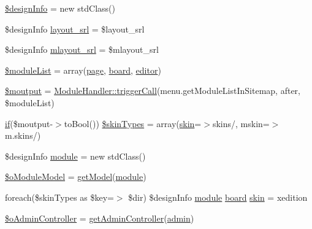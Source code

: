 \begin{DoxyCompactItemize}
\item 
\hyperlink{ko_8install_8php_a99e144f7d563ceb76b003d54739b3b0c}{\$design\+Info} = new std\+Class()
\item 
\$design\+Info \hyperlink{ko_8install_8php_a70054876db09b2519a1726663c8dd9e7}{layout\+\_\+srl} = \$layout\+\_\+srl
\item 
\$design\+Info \hyperlink{ko_8install_8php_a9cf497537007b08c645bed35f564be54}{mlayout\+\_\+srl} = \$mlayout\+\_\+srl
\item 
\hyperlink{ko_8install_8php_aaa80946d50e2d3677fbbc6d6c8a643c3}{\$module\+List} = array(\textquotesingle{}\hyperlink{classpage}{page}\textquotesingle{}, \textquotesingle{}\hyperlink{classboard}{board}\textquotesingle{}, \textquotesingle{}\hyperlink{classeditor}{editor}\textquotesingle{})
\item 
\hyperlink{ko_8install_8php_a2598d068355cca17645bc6bd70cc3a8c}{\$moutput} = \hyperlink{classModuleHandler_aa1b1f9eae91ccd76e6a81c9375c2e673}{Module\+Handler\+::trigger\+Call}(\textquotesingle{}menu.\+get\+Module\+List\+In\+Sitemap\textquotesingle{}, \textquotesingle{}after\textquotesingle{}, \$module\+List)
\item 
\hyperlink{point__level__icon_8addon_8php_a29031816e50a8f742422e671b2bef9b2}{if}(\$moutput-\/$>$to\+Bool()) \hyperlink{ko_8install_8php_aa61073b7b359568eb3459da113fd8cdf}{\$skin\+Types} = array(\textquotesingle{}\hyperlink{ko_8install_8php_ab0f2b49fdb57754496b34f6b880cdeaf}{skin}\textquotesingle{}=$>$\textquotesingle{}skins/\textquotesingle{}, \textquotesingle{}mskin\textquotesingle{}=$>$\textquotesingle{}m.\+skins/\textquotesingle{})
\item 
\$design\+Info \hyperlink{ko_8install_8php_a5c3fc1968f94c2b6a7c60845f284de78}{module} = new std\+Class()
\item 
\hyperlink{ko_8install_8php_a8d7a87df524e7d6938f66f8e284cdd1e}{\$o\+Module\+Model} = \hyperlink{func_8inc_8php_aecdfcc5332bcf22df01fc21a03b64435}{get\+Model}(\textquotesingle{}\hyperlink{classmodule}{module}\textquotesingle{})
\item 
foreach(\$skin\+Types as \$key=$>$ \$dir) \$design\+Info \hyperlink{classmodule}{module} \hyperlink{classboard}{board} \hyperlink{ko_8install_8php_ab0f2b49fdb57754496b34f6b880cdeaf}{skin} = \textquotesingle{}xedition\textquotesingle{}
\item 
\hyperlink{ko_8install_8php_a52d90466dc7adee7d324b3ef032b8167}{\$o\+Admin\+Controller} = \hyperlink{func_8inc_8php_a2f7ca88a5226536aca3b2f5682bd7b2d}{get\+Admin\+Controller}(\textquotesingle{}\hyperlink{classadmin}{admin}\textquotesingle{})

\end{DoxyCompactItemize}
